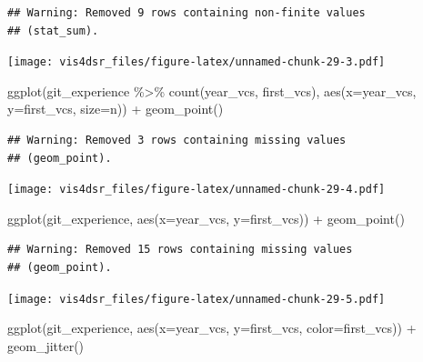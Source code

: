 \documentclass[
]{krantz}
\makeatletter
\newenvironment{Shaded}{\begin{snugshade}}{\end{snugshade}}
\newcommand{\AttributeTok}[1]{\textcolor[rgb]{0.61,0.61,0.61}{#1}}
\newcommand{\FunctionTok}[1]{\textcolor[rgb]{0,0,0}{#1}}
\newcommand{\NormalTok}[1]{#1}
\newcommand{\SpecialCharTok}[1]{\textcolor[rgb]{0,0,0}{#1}}
\newenvironment{kframe}{%
\medskip{}
\setlength{\fboxsep}{.8em}
 \def\at@end@of@kframe{}%
 \ifinner\ifhmode%
  \def\at@end@of@kframe{\end{minipage}}%
  \begin{minipage}{\columnwidth}%
 \fi\fi%
 \def\FrameCommand##1{\hskip\@totalleftmargin \hskip-\fboxsep
 \colorbox{shadecolor}{##1}\hskip-\fboxsep
     \hskip-\linewidth \hskip-\@totalleftmargin \hskip\columnwidth}%
 \MakeFramed {\advance\hsize-\width
   \@totalleftmargin\z@ \linewidth\hsize
   \@setminipage}}%
 {\par\unskip\endMakeFramed%
 \at@end@of@kframe}
\renewenvironment{Shaded}{\begin{kframe}}{\end{kframe}}
\makeatother
\begin{document}
\begin{verbatim}
## Warning: Removed 9 rows containing non-finite values
## (stat_sum).
\end{verbatim}

\texttt{[image: vis4dsr\_files/figure-latex/unnamed-chunk-29-3.pdf]}

\begin{Shaded}
\begin{Highlighting}[]
\FunctionTok{ggplot}\NormalTok{(git\_experience }\SpecialCharTok{\%\textgreater{}\%} \FunctionTok{count}\NormalTok{(year\_vcs, first\_vcs), }
       \FunctionTok{aes}\NormalTok{(}\AttributeTok{x=}\NormalTok{year\_vcs, }\AttributeTok{y=}\NormalTok{first\_vcs, }\AttributeTok{size=}\NormalTok{n)) }\SpecialCharTok{+}
  \FunctionTok{geom\_point}\NormalTok{()}
\end{Highlighting}
\end{Shaded}

\begin{verbatim}
## Warning: Removed 3 rows containing missing values
## (geom_point).
\end{verbatim}

\texttt{[image: vis4dsr\_files/figure-latex/unnamed-chunk-29-4.pdf]}

\begin{Shaded}
\begin{Highlighting}[]
\FunctionTok{ggplot}\NormalTok{(git\_experience, }\FunctionTok{aes}\NormalTok{(}\AttributeTok{x=}\NormalTok{year\_vcs, }\AttributeTok{y=}\NormalTok{first\_vcs)) }\SpecialCharTok{+}
  \FunctionTok{geom\_point}\NormalTok{()}
\end{Highlighting}
\end{Shaded}

\begin{verbatim}
## Warning: Removed 15 rows containing missing values
## (geom_point).
\end{verbatim}

\texttt{[image: vis4dsr\_files/figure-latex/unnamed-chunk-29-5.pdf]}

\begin{Shaded}
\begin{Highlighting}[]
\FunctionTok{ggplot}\NormalTok{(git\_experience, }\FunctionTok{aes}\NormalTok{(}\AttributeTok{x=}\NormalTok{year\_vcs, }\AttributeTok{y=}\NormalTok{first\_vcs, }\AttributeTok{color=}\NormalTok{first\_vcs)) }\SpecialCharTok{+}
  \FunctionTok{geom\_jitter}\NormalTok{()}
\end{Highlighting}
\end{Shaded}
\end{document}
